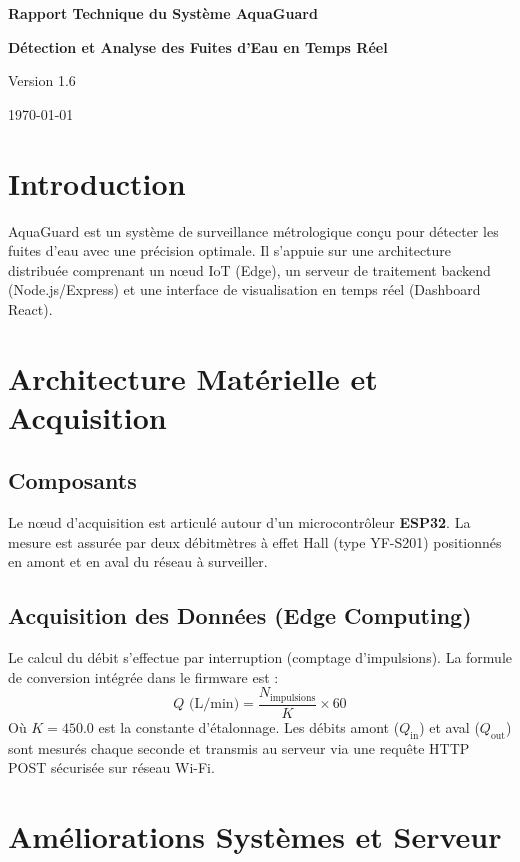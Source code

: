 \documentclass[12pt,a4paper]{article}
\title{}
\author{}
\date{}
\renewcommand{\maketitle}{
  \begin{titlepage}
    \centering
    \vspace*{\fill}
    
    {\Huge\bfseries\color{bleuprincipal} Rapport Technique du Système AquaGuard\par}
    \vspace{0.5cm}
    {\Large\bfseries\color{bleufonce} Détection et Analyse des Fuites d'Eau en Temps Réel\par}
    \vspace{2cm}
    {\large\color{gray} Version 1.6\par}
    \vspace{0.5cm}
    {\large\color{gray} \today\par}
    
    \vspace*{\fill}
  \end{titlepage}
}
\begin{document}
\maketitle

\tableofcontents
\thispagestyle{empty}
\newpage

\pagestyle{fancy}
\setcounter{page}{1}

\section{Introduction}
AquaGuard est un système de surveillance métrologique conçu pour détecter les fuites d'eau avec une \textcolor{vertaccent}{précision optimale}. Il s'appuie sur une architecture distribuée comprenant un nœud IoT (Edge), un serveur de traitement backend (Node.js/Express) et une interface de visualisation en temps réel (Dashboard React).

\section{Architecture Matérielle et Acquisition}

\subsection{Composants}
Le nœud d'acquisition est articulé autour d'un microcontrôleur \textbf{\textcolor{bleufonce}{ESP32}}. La mesure est assurée par deux débitmètres à effet Hall (type YF-S201) positionnés en amont et en aval du réseau à surveiller.

\subsection{Acquisition des Données (Edge Computing)}
Le calcul du débit s'effectue par interruption (comptage d'impulsions). La formule de conversion intégrée dans le firmware est :
\begin{equation}
\boxed{Q \text{ (L/min)} = \frac{N_{\text{impulsions}}}{K} \times 60}
\end{equation}
Où $K = 450.0$ est la constante d'étalonnage. Les débits amont ($Q_{\text{in}}$) et aval ($Q_{\text{out}}$) sont mesurés chaque seconde et transmis au serveur via une requête HTTP POST sécurisée sur réseau Wi-Fi.

\section{Améliorations Systèmes et Serveur}
\end{document}
